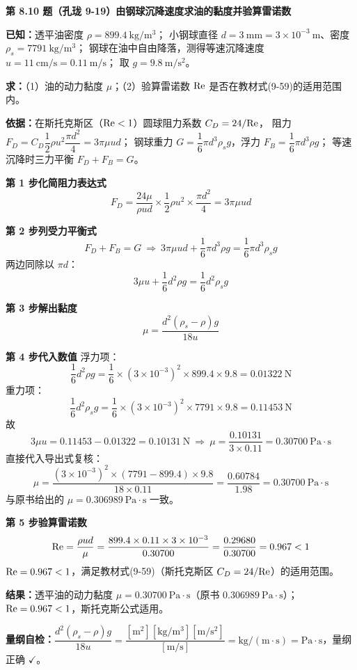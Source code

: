 \noindent\textbf{第 8.10 题（孔珑 9-19）\quad 由钢球沉降速度求油的黏度并验算雷诺数}

\begin{jie}
\textbf{已知：}透平油密度 $\rho=899.4\ \mathrm{kg/m^3}$；
小钢球直径 $d=3\ \mathrm{mm}=3\times10^{-3}\ \mathrm{m}$、密度 $\rho_s=7791\ \mathrm{kg/m^3}$；
钢球在油中自由降落，测得等速沉降速度 $u=11\ \mathrm{cm/s}=0.11\ \mathrm{m/s}$；
取 $g=9.8\ \mathrm{m/s^2}$。

\textbf{求：}（1）油的动力黏度 $\mu$；（2）验算雷诺数 $\mathrm{Re}$ 是否在教材式(9-59)的适用范围内。

\textbf{依据：}在斯托克斯区（$\mathrm{Re}<1$）圆球阻力系数 $C_D=24/\mathrm{Re}$，
阻力 $F_D=C_D\dfrac{1}{2}\rho u^{2}\dfrac{\pi d^{2}}{4}=3\pi\mu u d$；
钢球重力 $G=\dfrac{1}{6}\pi d^{3}\rho_s g$，浮力 $F_B=\dfrac{1}{6}\pi d^{3}\rho g$；
等速沉降时三力平衡 $F_D+F_B=G$。

\textbf{第 1 步\quad 化简阻力表达式}
\[ F_D=\frac{24\mu}{\rho u d}\times\frac{1}{2}\rho u^{2}\times\frac{\pi d^{2}}{4}=3\pi\mu u d \]

\textbf{第 2 步\quad 列受力平衡式}
\[ F_D+F_B=G\ \Longrightarrow\ 3\pi\mu u d+\frac{1}{6}\pi d^{3}\rho g=\frac{1}{6}\pi d^{3}\rho_s g \]
两边同除以 $\pi d$：
\[ 3\mu u+\frac{1}{6}d^{2}\rho g=\frac{1}{6}d^{2}\rho_s g \]

\textbf{第 3 步\quad 解出黏度}
\[ \mu=\frac{d^{2}\left(\rho_s-\rho\right)g}{18u} \]

\textbf{第 4 步\quad 代入数值}
浮力项：
\[ \frac{1}{6}d^{2}\rho g=\frac{1}{6}\times\left(3\times10^{-3}\right)^{2}\times899.4\times9.8=0.01322\ \mathrm{N} \]
重力项：
\[ \frac{1}{6}d^{2}\rho_s g=\frac{1}{6}\times\left(3\times10^{-3}\right)^{2}\times7791\times9.8=0.11453\ \mathrm{N} \]
故
\[ 3\mu u=0.11453-0.01322=0.10131\ \mathrm{N}
\ \Longrightarrow\ \mu=\frac{0.10131}{3\times0.11}=0.30700\ \mathrm{Pa\cdot s} \]
直接代入导出式复核：
\[ \mu=\frac{\left(3\times10^{-3}\right)^{2}\times(7791-899.4)\times9.8}{18\times0.11}
=\frac{0.60784}{1.98}=0.30700\ \mathrm{Pa\cdot s} \]
与原书给出的 $\mu=0.306989\ \mathrm{Pa\cdot s}$ 一致。

\textbf{第 5 步\quad 验算雷诺数}
\[ \mathrm{Re}=\frac{\rho u d}{\mu}=\frac{899.4\times0.11\times3\times10^{-3}}{0.30700}
=\frac{0.29680}{0.30700}=0.967<1 \]
$\mathrm{Re}=0.967<1$，满足教材式(9-59)（斯托克斯区 $C_D=24/\mathrm{Re}$）的适用范围。

\textbf{结果：}透平油的动力黏度 $\mu=0.30700\ \mathrm{Pa\cdot s}$（原书 $0.306989\ \mathrm{Pa\cdot s}$）；
$\mathrm{Re}=0.967<1$，斯托克斯公式适用。

\textbf{量纲自检：}$\dfrac{d^{2}(\rho_s-\rho)g}{18u}
=\dfrac{[\mathrm{m^2}][\mathrm{kg/m^3}][\mathrm{m/s^2}]}{[\mathrm{m/s}]}
=\mathrm{kg/(m\cdot s)}=\mathrm{Pa\cdot s}$，量纲正确 $\checkmark$。
\end{jie}

